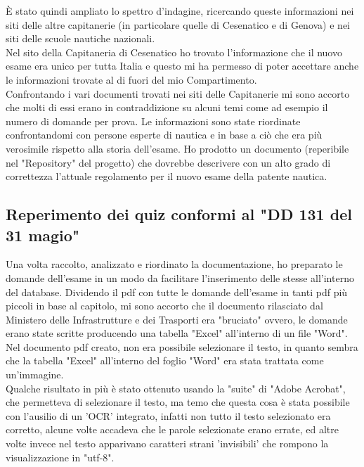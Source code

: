 È stato quindi ampliato lo spettro d'indagine, ricercando queste informazioni nei siti delle altre capitanerie (in particolare quelle di Cesenatico e di Genova) e nei siti delle scuole nautiche nazionali.\\
Nel sito della Capitaneria di Cesenatico ho trovato l'informazione che il nuovo esame era unico per tutta Italia e questo mi ha permesso di poter accettare anche le informazioni trovate al di fuori del mio Compartimento.\\
Confrontando i vari documenti trovati nei siti delle Capitanerie mi sono accorto che molti di essi erano in contraddizione su alcuni temi come ad esempio il numero di domande per prova. Le informazioni sono state riordinate confrontandomi con persone esperte di nautica e in base a ciò che era più verosimile rispetto alla storia dell'esame. Ho prodotto un documento (reperibile nel "Repository" del progetto) che dovrebbe descrivere con un alto grado di correttezza l'attuale regolamento per il nuovo esame della patente nautica.\\

\subsection{Reperimento dei quiz conformi al "DD 131 del 31 magio"}
Una volta raccolto, analizzato e riordinato la documentazione, ho preparato le domande dell'esame in un modo da facilitare l'inserimento delle stesse all'interno del database. Dividendo il pdf con tutte le domande dell'esame in tanti pdf più piccoli in base al capitolo, mi sono accorto che il documento rilasciato dal Ministero delle Infrastrutture e dei Trasporti era "bruciato" ovvero, le domande erano state scritte producendo una tabella "Excel" all'interno di un file "Word". Nel documento pdf creato, non era possibile selezionare il testo, in quanto sembra che la tabella "Excel" all'interno del foglio "Word" era stata trattata come un'immagine.\\
Qualche risultato in più è stato ottenuto usando la "suite" di "Adobe Acrobat", che permetteva di selezionare il testo, ma temo che questa cosa è stata possibile con l'ausilio di un 'OCR' integrato, infatti non tutto il testo selezionato era corretto, alcune volte accadeva che le parole selezionate erano errate, ed altre volte invece nel testo apparivano caratteri strani 'invisibili' che rompono la visualizzazione in "utf-8".